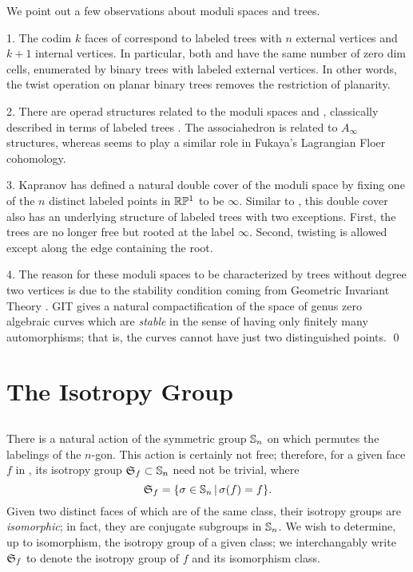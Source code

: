\documentclass[10pt]{amsart}
\begin{document}
\begin{rem} We point out a few observations about moduli spaces and trees.

1. The codim $k$ faces of  correspond to labeled trees with $n$ external vertices and $k+1$ internal vertices. In particular, both  and  have the same number of zero dim cells, enumerated by binary trees with labeled external vertices.  In other words, the twist operation on planar binary trees removes the restriction of planarity.

2. There are operad structures related to the moduli spaces  \cite{dev} and  \cite{gk}, classically  described in terms of labeled trees \cite[\S 1.4]{bv}. The associahedron is related to $A_\infty$ structures, whereas  seems to play a similar role in Fukaya's Lagrangian Floer cohomology.

3. Kapranov \cite{kap} has defined a natural double cover of the moduli space  by fixing one of the $n$ distinct labeled points in ${\mathbb R} {\mathbb P}^1$ to be $\infty$. Similar to , this double cover also has an underlying structure of labeled trees \cite[\S 4.3]{dev} with two exceptions. First, the trees are no longer free but rooted at the label $\infty$.  Second, twisting is allowed except along the edge containing the root.

4. The reason for these moduli spaces to be characterized by trees without degree two vertices is due to the stability condition coming from Geometric Invariant Theory \cite[\S 8]{git}.  GIT gives a natural compactification of the space of  genus zero algebraic curves which are {\em stable} in the sense of having only finitely many automorphisms; that is, the curves cannot have just two distinguished points.
\qed

\end{rem}

%
%

\section {The Isotropy Group}

\subsection{}
There is a natural action of the symmetric group $\mathbb S_n$ on  which permutes the labelings of the $n$-gon. This action is certainly not free; therefore, for a given face $f$ in , its isotropy group ${\mathfrak S}_f \subset \mathbb S_n$ need not be trivial, where  
$${\mathfrak S}_f = \{\sigma \in \mathbb S_n \,|\, \sigma(f) = f\}.$$
Given two distinct faces of  which are of the same class, their isotropy groups are {\em isomorphic}; in fact, they are conjugate subgroups in $\mathbb S_n$.  We wish to determine, up to isomorphism, the isotropy group of a given class; we interchangably write ${\mathfrak S}_f$ to denote the isotropy group of $f$ and its isomorphism class.
\end{document}
